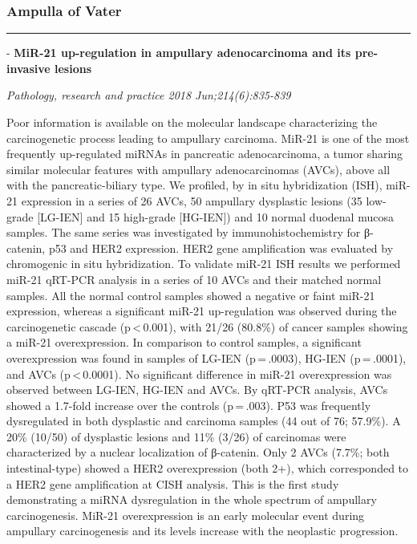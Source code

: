\documentclass[]{article}
\begin{document}
\hypertarget{ampulla-of-vater}{%
\subsubsection{Ampulla of Vater}\label{ampulla-of-vater}}

\begin{center}\rule{0.5\linewidth}{\linethickness}\end{center}

 - \textbf{MiR-21 up-regulation in ampullary adenocarcinoma and its
pre-invasive lesions}

\emph{Pathology, research and practice 2018 Jun;214(6):835-839}

Poor information is available on the molecular landscape characterizing
the carcinogenetic process leading to ampullary carcinoma. MiR-21 is one
of the most frequently up-regulated miRNAs in pancreatic adenocarcinoma,
a tumor sharing similar molecular features with ampullary
adenocarcinomas (AVCs), above all with the pancreatic-biliary type. We
profiled, by in situ hybridization (ISH), miR-21 expression in a series
of 26 AVCs, 50 ampullary dysplastic lesions (35 low-grade {[}LG-IEN{]}
and 15 high-grade {[}HG-IEN{]}) and 10 normal duodenal mucosa samples.
The same series was investigated by immunohistochemistry for β-catenin,
p53 and HER2 expression. HER2 gene amplification was evaluated by
chromogenic in situ hybridization. To validate miR-21 ISH results we
performed miR-21 qRT-PCR analysis in a series of 10 AVCs and their
matched normal samples. All the normal control samples showed a negative
or faint miR-21 expression, whereas a significant miR-21 up-regulation
was observed during the carcinogenetic cascade (p\,\textless{}\,0.001),
with 21/26 (80.8\%) of cancer samples showing a miR-21 overexpression.
In comparison to control samples, a significant overexpression was found
in samples of LG-IEN (p\,=\,.0003), HG-IEN (p\,=\,.0001), and AVCs
(p\,\textless{}\,0.0001). No significant difference in miR-21
overexpression was observed between LG-IEN, HG-IEN and AVCs. By qRT-PCR
analysis, AVCs showed a 1.7-fold increase over the controls
(p\,=\,.003). P53 was frequently dysregulated in both dysplastic and
carcinoma samples (44 out of 76; 57.9\%). A 20\% (10/50) of dysplastic
lesions and 11\% (3/26) of carcinomas were characterized by a nuclear
localization of β-catenin. Only 2 AVCs (7.7\%; both intestinal-type)
showed a HER2 overexpression (both 2+), which corresponded to a HER2
gene amplification at CISH analysis. This is the first study
demonstrating a miRNA dysregulation in the whole spectrum of ampullary
carcinogenesis. MiR-21 overexpression is an early molecular event during
ampullary carcinogenesis and its levels increase with the neoplastic
progression.
\end{document}
